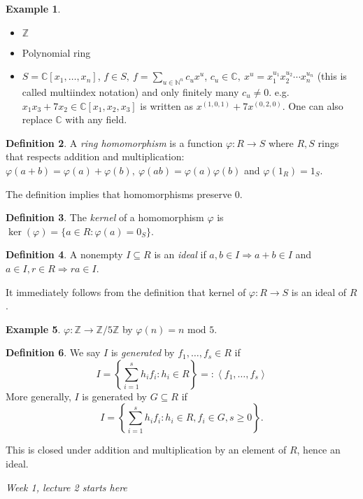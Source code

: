 \documentclass[a4paper]{article}
\newcommand{\la}{\left\langle}
\newcommand{\ra}{\right\rangle}
\newcommand{\Z}{\mathbb Z}
\newcommand{\C}{\mathbb C}
\newcommand{\Mod}{\text{ mod }}
\theoremstyle{definition}
\newtheorem{defn}{Definition}[subsection]
\newtheorem{example}[defn]{Example}
\begin{document}
\begin{example}
\begin{itemize}
\item $\Z$
\item Polynomial ring
\item $S=\C[x_1,\ldots,x_n]$, $\displaystyle f\in S,\ f=\sum_{u\in \mathbb N^n} c_u x^u$, $c_u\in \C,\ x^u=x_1^{u_1} x_2^{u_2} \cdots x_n^{u_n}$ (this is called multiindex notation) and only finitely many $c_u\neq 0$. e.g. $x_1 x_3 + 7x_2\in \C[x_1,x_2,x_3]$ is written as $x^{(1,0,1)}+7x^{(0,2,0)}$. One can also replace $\C$ with any field.
\end{itemize}
\end{example}
\begin{defn}
A \textit{ring homomorphism} is a function $\varphi:R\rightarrow S$ where $R,S$ rings that respects addition and multiplication: $\varphi(a+b)=\varphi(a)+\varphi(b),\ \varphi(ab)=\varphi(a)\varphi(b)$ and $\varphi(1_R)=1_S$.
\end{defn}
The definition implies that homomorphisms preserve 0.

\begin{defn}
The \textit{kernel} of a homomorphism $\varphi$ is $\ker (\varphi) = \{a\in R:\varphi(a)=0_S\}$.
\end{defn}

\begin{defn}
A nonempty $I\subseteq R$ is an \textit{ideal} if $a,b\in I \Rightarrow a+b\in I$ and $a\in I,r\in R\Rightarrow ra\in I$.
\end{defn}

It immediately follows from the definition that kernel of $\varphi:R\rightarrow S$ is an ideal of $R$.

\begin{example}
$\varphi:\Z \rightarrow \Z/5\Z$ by $\varphi(n) = n\Mod 5$.
\end{example}

\begin{defn}
We say $I$ is \textit{generated} by $f_1,\ldots,f_s\in R$ if
\[
I=\left\{\sum_{i=1}^s h_i f_i : h_i\in R \right\} =: \la f_1,\ldots,f_s\ra
\]
More generally, $I$ is generated by $G\subseteq R$ if
\[
I=\left\{\sum_{i=1}^s h_i f_i : h_i\in R, f_i\in G,s\geq 0 \right\}.
\]
\end{defn}
This is closed under addition and multiplication by an element of $R$, hence an ideal.

\begin{flushright}
\textit{Week 1, lecture 2 starts here}
\end{flushright}
\end{document}
